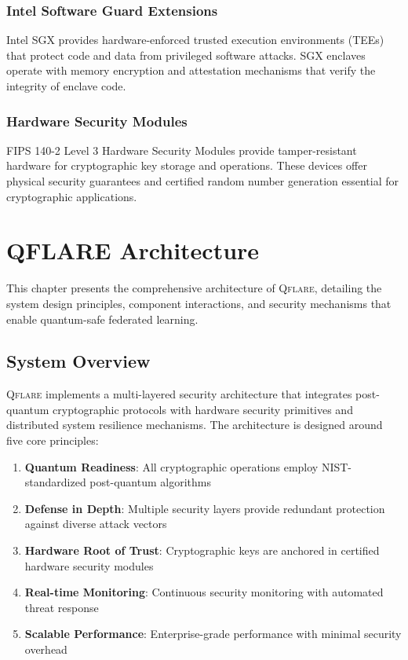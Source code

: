 ﻿\documentclass[12pt,a4paper,twoside]{book}
\newcommand{\qflare}{\textsc{Qflare}}
\begin{document}
\subsection{Intel Software Guard Extensions}
\label{subsec:sgx}

Intel SGX provides hardware-enforced trusted execution environments (TEEs) that protect code and data from privileged software attacks. SGX enclaves operate with memory encryption and attestation mechanisms that verify the integrity of enclave code.

\subsection{Hardware Security Modules}
\label{subsec:hsm}

FIPS 140-2 Level 3 Hardware Security Modules provide tamper-resistant hardware for cryptographic key storage and operations. These devices offer physical security guarantees and certified random number generation essential for cryptographic applications.

\chapter{QFLARE Architecture}
\label{ch:architecture}

This chapter presents the comprehensive architecture of \qflare{}, detailing the system design principles, component interactions, and security mechanisms that enable quantum-safe federated learning.

\section{System Overview}
\label{sec:system-overview}

\qflare{} implements a multi-layered security architecture that integrates post-quantum cryptographic protocols with hardware security primitives and distributed system resilience mechanisms. The architecture is designed around five core principles:

\begin{enumerate}
\item \textbf{Quantum Readiness}: All cryptographic operations employ NIST-standardized post-quantum algorithms
\item \textbf{Defense in Depth}: Multiple security layers provide redundant protection against diverse attack vectors
\item \textbf{Hardware Root of Trust}: Cryptographic keys are anchored in certified hardware security modules
\item \textbf{Real-time Monitoring}: Continuous security monitoring with automated threat response
\item \textbf{Scalable Performance}: Enterprise-grade performance with minimal security overhead
\end{enumerate}
\end{document}
